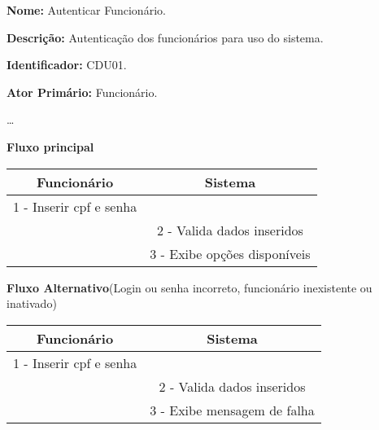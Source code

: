 	\par
	\textbf{Nome:} Autenticar Funcionário. 
	\par
	\textbf{Descrição:} Autenticação dos funcionários para uso do sistema.
	\par 
	\textbf{Identificador:} CDU01.
	\par
	\textbf{Ator Primário:} Funcionário.	
	\par
	\ldots
	\par
	\textbf{Fluxo principal}\par
	\begin{tabular}{|c|c|}
		\hline 
		Funcionário & Sistema \\ 
		\hline 
		1 - Inserir cpf e senha  &  \\ 
		\hline 
		& 
		
		2 - Valida dados inseridos 
		\\ 
		\hline 
		& 
		
		3 - Exibe opções disponíveis
		\\ 
		\hline 
	\end{tabular} 
	\vspace{12px}
	\par
	\textbf{Fluxo Alternativo}(Login ou senha incorreto, funcionário inexistente ou inativado)\par
	\begin{tabular}{|c|c|}
		\hline 
		Funcionário & Sistema \\ 
		\hline 
		1 - Inserir cpf e senha  &  \\ 
		\hline 
		& 
		
		2 - Valida dados inseridos 
		\\ 
		\hline 
		& 
				
		3 - Exibe mensagem de falha		
		\\ 
		\hline 
	\end{tabular} 
	\vspace{12px}

